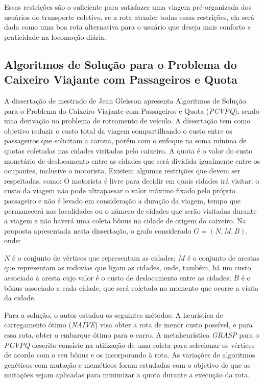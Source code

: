 Essas restrições são o suficiente para satisfazer uma viagem pré-organizada dos usuários do transporte coletivo, se a rota atender todas essas restrições, ela será dada como uma boa rota alternativa para o usuário que deseja mais conforto e praticidade na locomoção diária.

 
 \subsection{Algoritmos de Solução para o Problema do Caixeiro Viajante com Passageiros e Quota \cite{silva2017algoritmos}}
 
A dissertação de mestrado de Jean Gleisson apresenta Algoritmos de Solução para o Problema do Caixeiro Viajante com Passageiros e Quota (\emph{PCVPQ}), sendo uma derivação no problema de roteamento de veículo. A dissertação tem como objetivo reduzir o custo total da viagem compartilhando o custo entre os passageiros que solicitam a carona, porém com o enfoque na soma mínima de quotas coletadas nas cidades visitadas pelo caixeiro. A quota é o valor do custo monetário de deslocamento entre as cidades que será dividida igualmente entre os ocupantes, inclusive o motorista.
Existem algumas restrições que devem ser respeitadas, como: O motorista é livre para decidir em quais cidades irá visitar; o custo da viagem não pode ultrapassar o valor máximo fixado pelo próprio passageiro e não é levado em consideração a duração da viagem, tempo que permanecerá nas localidades ou o número de cidades que serão visitadas durante a viagem e não haverá uma coleta bônus na cidade de origem do caixeiro.
Na proposta apresentada nesta dissertação, o grafo considerado $G = (N, M, B)$, onde:

$N$ é o conjunto de vértices que representam as cidades;
$M$ é o conjunto de arestas que representam as rodovias que ligam as cidades, onde, também, há um custo associado à aresta cujo valor é o custo de deslocamento entre as cidades;
$B$ é o bônus associado a cada cidade, que será coletado no momento que ocorre a visita da cidade.

Para a solução, o autor estudou os seguintes métodos:
A heurística de carregamento ótimo (\emph{NAIVE}) visa obter a rota de menor custo possível, e para essa rota, obter o embarque ótimo para o carro.
A metaheurística \emph{GRASP} para o \emph{PCVPQ} descrito consiste na utilização de uma roleta para selecionar os vértices de acordo com o seu bônus e os incorporando à rota.
As variações de algoritmos genéticos com mutação e meméticos foram estudadas com o objetivo de que as mutações sejam aplicadas para minimizar a quota durante a execução da rota.

